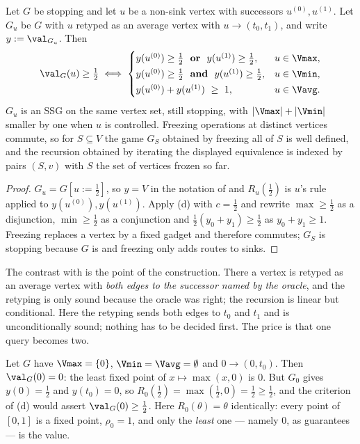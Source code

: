 \begin{corollary}\label{cor:bv-threshold}
Let $G$ be stopping and let $u$ be a non-sink vertex with successors
$u^{(0)},u^{(1)}$. Let $G_u$ be $G$ with $u$ retyped as an average vertex
with $u\to(t_0,t_1)$, and write $y:=\val_{G_u}$. Then
\[
  \val_G(u)\ge\tfrac12
  \iff
  \begin{cases}
    y(u^{(0)})\ge\tfrac12 \ \ \textbf{or}\ \ y(u^{(1)})\ge\tfrac12, & u\in\Vmax,\\[2pt]
    y(u^{(0)})\ge\tfrac12 \ \ \textbf{and}\ \ y(u^{(1)})\ge\tfrac12, & u\in\Vmin,\\[2pt]
    y(u^{(0)})+y(u^{(1)})\ \ge\ 1, & u\in\Vavg .
  \end{cases}
\]
$G_u$ is an SSG on the same vertex set, still stopping, with
$|\Vmax|+|\Vmin|$ smaller by one when $u$ is controlled. Freezing
operations at distinct vertices commute, so for $S\subseteq V$ the game
$G_S$ obtained by freezing all of $S$ is well defined, and the recursion
obtained by iterating the displayed equivalence is indexed by pairs
$(S,v)$ with $S$ the set of vertices frozen so far.
\end{corollary}

\begin{proof}
$G_u=G[u{:=}\tfrac12]$, so $y=V$ in the notation of
 and $R_u(\tfrac12)$ is $u$'s rule applied to
$y(u^{(0)}),y(u^{(1)})$. Apply (d) with
$c=\tfrac12$ and rewrite $\max\ge\tfrac12$ as a disjunction,
$\min\ge\tfrac12$ as a conjunction and
$\tfrac12(y_0+y_1)\ge\tfrac12$ as $y_0+y_1\ge1$. Freezing replaces a
vertex by a fixed gadget and therefore commutes; $G_S$ is stopping
because $G$ is and freezing only adds routes to sinks.
\end{proof}

\begin{remark}\label{rem:bv-oracle-free}
The contrast with  is the point of the
construction. There a vertex is retyped as an average vertex with
\emph{both edges to the successor named by the oracle}, and the retyping
is only sound because the oracle was right; the recursion is linear but
conditional. Here the retyping sends both edges to $t_0$ and $t_1$ and is
unconditionally sound; nothing has to be decided first. The price is that
one query becomes two.
\end{remark}

\begin{example}\label{ex:bv-nonstopping}
Let $G$ have $\Vmax=\{0\}$, $\Vmin=\Vavg=\emptyset$ and $0\to(0,t_0)$. Then
$\val_G(0)=0$: the least fixed point of $x\mapsto\max(x,0)$ is $0$. But
$G_0$ gives $y(0)=\tfrac12$ and $y(t_0)=0$, so
$R_0(\tfrac12)=\max(\tfrac12,0)=\tfrac12\ge\tfrac12$, and the criterion of
(d) would assert $\val_G(0)\ge\tfrac12$. Here
$R_0(\theta)=\theta$ identically: every point of $[0,1]$ is a fixed point,
$\rho_0=1$, and only the \emph{least} one --- namely $0$, as
 guarantees --- is the value.
\end{example}

